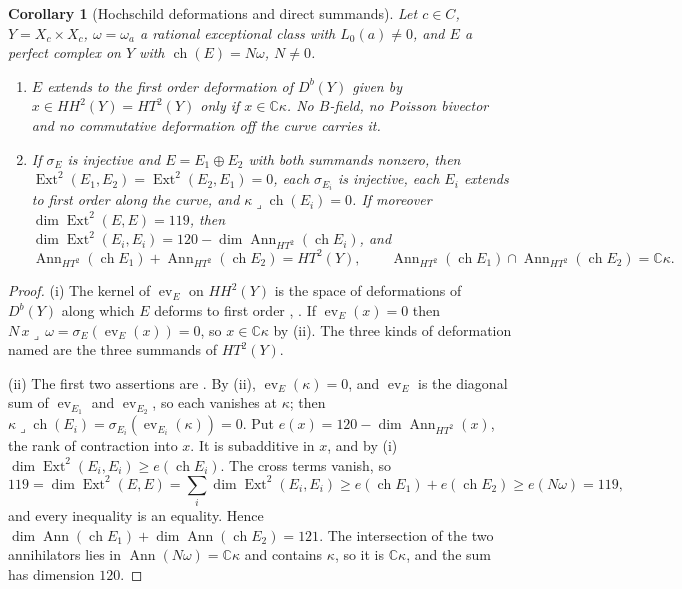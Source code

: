 \documentclass[11pt,reqno]{amsart}
\theoremstyle{plain}
\newtheorem{corollary}[theorem]{Corollary}
\theoremstyle{definition}
\theoremstyle{remark}
\newcommand{\CC}{\mathbb{C}}
\DeclareMathOperator{\ch}{ch}
\DeclareMathOperator{\Ext}{Ext}
\DeclareMathOperator{\Ann}{Ann}
\begin{document}
\begin{corollary}[Hochschild deformations and direct summands]
\label{cor:mumfordsplit}
Let $c\in C$, $Y=X_{c}\times X_{c}$, $\omega=\omega_{a}$ a rational
exceptional class with $L_{0}(a)\ne0$, and $E$ a perfect complex on $Y$ with
$\ch(E)=N\omega$, $N\ne0$.
\begin{enumerate}[label=\textup{(\roman*)},leftmargin=2.6em,itemsep=2pt]
\item $E$ extends to the first order deformation of $D^{b}(Y)$ given by
  $x\in HH^{2}(Y)=HT^{2}(Y)$ only if $x\in\CC\kappa$. No $B$-field, no
  Poisson bivector and no commutative deformation off the curve carries it.
\item If $\sigma_{E}$ is injective and $E=E_{1}\oplus E_{2}$ with both
  summands nonzero, then $\Ext^{2}(E_{1},E_{2})=\Ext^{2}(E_{2},E_{1})=0$, each
  $\sigma_{E_{i}}$ is injective, each $E_{i}$ extends to first order along the
  curve, and $\kappa\lrcorner\ch(E_{i})=0$. If moreover
  $\dim\Ext^{2}(E,E)=119$, then $\dim\Ext^{2}(E_{i},E_{i})=
  120-\dim\Ann_{HT^{2}}(\ch E_{i})$, and
  \[
    \Ann_{HT^{2}}(\ch E_{1})+\Ann_{HT^{2}}(\ch E_{2})=HT^{2}(Y),\qquad
    \Ann_{HT^{2}}(\ch E_{1})\cap\Ann_{HT^{2}}(\ch E_{2})=\CC\kappa .
  \]
\end{enumerate}
\end{corollary}

\begin{proof}
(i) The kernel of $\operatorname{ev}_{E}$ on $HH^{2}(Y)$ is the space of
deformations of $D^{b}(Y)$ along which $E$ deforms to first order
\cite{Tod09}, \cite[Section~8.3]{Mar25a}. If $\operatorname{ev}_{E}(x)=0$ then
$N\,x\lrcorner\,\omega=\sigma_{E}(\operatorname{ev}_{E}(x))=0$, so
$x\in\CC\kappa$ by (ii). The three kinds of
deformation named are the three summands of $HT^{2}(Y)$.

(ii) The first two assertions are . By
(ii), $\operatorname{ev}_{E}(\kappa)=0$, and
$\operatorname{ev}_{E}$ is the diagonal sum of $\operatorname{ev}_{E_{1}}$
and $\operatorname{ev}_{E_{2}}$, so each vanishes at $\kappa$; then
$\kappa\lrcorner\ch(E_{i})=\sigma_{E_{i}}(\operatorname{ev}_{E_{i}}(\kappa))
=0$. Put $e(x)=120-\dim\Ann_{HT^{2}}(x)$, the rank of contraction into $x$.
It is subadditive in $x$, and by (i)
$\dim\Ext^{2}(E_{i},E_{i})\ge e(\ch E_{i})$. The cross terms vanish, so
\[
  119=\dim\Ext^{2}(E,E)=\sum_{i}\dim\Ext^{2}(E_{i},E_{i})
  \ge e(\ch E_{1})+e(\ch E_{2})\ge e(N\omega)=119,
\]
and every inequality is an equality. Hence
$\dim\Ann(\ch E_{1})+\dim\Ann(\ch E_{2})=121$. The intersection of the two
annihilators lies in $\Ann(N\omega)=\CC\kappa$ and contains $\kappa$, so it is
$\CC\kappa$, and the sum has dimension $120$.
\end{proof}
\end{document}
